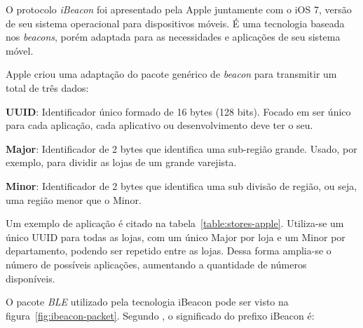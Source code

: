 \documentclass[
	12pt,				%
	openright,			%
	oneside,			%
	a4paper,			%
	chapter=TITLE,		%
	english,			%
	brazil				%
	]{abntex2}
\begin{document}
{O protocolo \textit{iBeacon} foi apresentado pela Apple juntamente com o iOS 7, versão de seu sistema operacional para dispositivos móveis. É uma tecnologia baseada nos \textit{beacons}, porém adaptada para as necessidades e aplicações de seu sistema móvel.

Apple criou uma adaptação do pacote genérico de \textit{beacon} para transmitir um total de três dados:

\begin{alineas}
	\item \textbf{UUID}: Identificador único formado de 16 bytes (128 bits). Focado em ser único para cada aplicação, cada aplicativo ou desenvolvimento deve ter o seu.
	\item \textbf{Major}: Identificador de 2 bytes que identifica uma sub-região grande. Usado, por exemplo, para dividir as lojas de um grande varejista.
	\item \textbf{Minor}: Identificador de 2 bytes que identifica uma sub divisão de região, ou seja, uma região menor que o Minor.
\end{alineas}

Um exemplo de aplicação é citado na tabela~\ref{table:stores-apple}. Utiliza-se um único UUID para todas as lojas, com um único Major por loja e um Minor por departamento, podendo ser repetido entre as lojas. Dessa forma amplia-se o número de possíveis aplicações, aumentando a quantidade de números disponíveis.

\begin{table}[htb]
\end{table}

O pacote \textit{BLE} utilizado pela tecnologia iBeacon pode ser visto na figura~\ref{fig:ibeacon-packet}. Segundo , o significado do prefixo iBeacon é:

}
\end{document}

